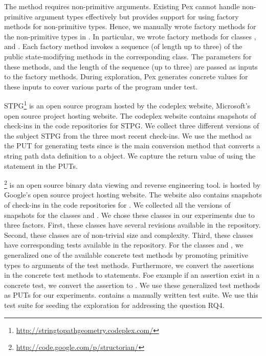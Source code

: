The method  requires non-primitive arguments. Existing Pex cannot handle non-primitive argument types effectively but provides support for using factory methods for non-primitive types. Hence, we manually wrote factory methods for the non-primitive types in . In particular, we wrote factory methods for classes ,  and . Each factory method invokes a sequence (of length up to three) of the public state-modifying methods in the corresponding class. The parameters for these methods, and the length of the sequence (up to three) are passed as inputs to the factory methods. During exploration, Pex generates concrete values for these inputs to cover various parts of the program under test.

STPG\footnote{\url{http://stringtopathgeometry.codeplex.com/}} is an open source program hosted by the codeplex website, Microsoft's open source project hosting website. The codeplex website contains snapshots of check-ins in the code repositories for STPG. We collect three different versions of the subject STPG from the three most recent check-ins. We use the  method as the PUT for generating tests since  is the main conversion method that converts a string path data definition to a  object.
We capture the return value of  using the  statement in the PUTs.


\footnote{\url{http://code.google.com/p/structorian/}} is an open source binary data viewing and reverse engineering tool.  is hosted by Google's open source project hosting website. The website also contains snapshots of check-ins in the code repositories for . We collected all the versions of snapshots for the classes  and . We chose these classes in our experiments due to three factors. First, these classes have several revisions available in the repository. Second, these classes are of non-trivial size and complexity. Third, these classes have corresponding tests available in the repository. For the classes  and  , we generalized one of the available concrete test methods by promoting primitive types to arguments of the test methods. 
Furthermore, we convert the assertions in the concrete test methods to  statements.
Foe example if an assertion  exist in a concrete test, we convert the assertion to
.
We use these generalized test methods as PUTs for our experiments.  contains a manually written test suite. We use this test suite for seeding the exploration for addressing the question RQ4.

